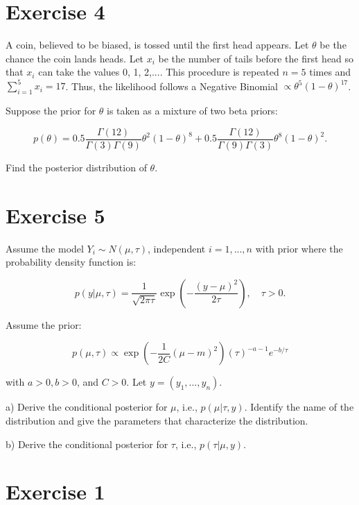 \documentclass{article}
\begin{document}
\section{Exercise 4}

A coin, believed to be biased, is tossed until the first head appears. Let $\theta$ be the chance the coin lands heads. Let $x_i$ be the number of tails before the first head so that $x_i$ can take the values 0, 1, 2,.... This procedure is repeated $n = 5$ times and $\sum_{i=1}^5 x_i = 17$. Thus, the likelihood follows a Negative Binomial $\propto \theta^5(1-\theta)^{17}$.

Suppose the prior for $\theta$ is taken as a mixture of two beta priors:

\[
p(\theta) = 0.5\frac{\Gamma(12)}{\Gamma(3)\Gamma(9)}\theta^2(1-\theta)^8 + 0.5\frac{\Gamma(12)}{\Gamma(9)\Gamma(3)}\theta^8(1-\theta)^2.
\]

Find the posterior distribution of $\theta$.

\section{Exercise 5}

Assume the model $Y_i \sim N(\mu, \tau)$, independent $i = 1,...,n$ with prior where the probability density function is:

\[
p(y|\mu, \tau) = \frac{1}{\sqrt{2\pi\tau}} \exp\left(-\frac{(y-\mu)^2}{2\tau}\right), \quad \tau > 0.
\]

Assume the prior:

\[
p(\mu, \tau) \propto \exp\left(-\frac{1}{2C}(\mu-m)^2\right) (\tau)^{-a-1} e^{-b/\tau}
\]

with $a > 0, b > 0$, and $C > 0$. Let $y = (y_1,...,y_n)$.

a) Derive the conditional posterior for $\mu$, i.e., $p(\mu|\tau, y)$. Identify the name of the distribution and give the parameters that characterize the distribution.

b) Derive the conditional posterior for $\tau$, i.e., $p(\tau|\mu, y)$.








\section{Exercise 1}
\end{document}
